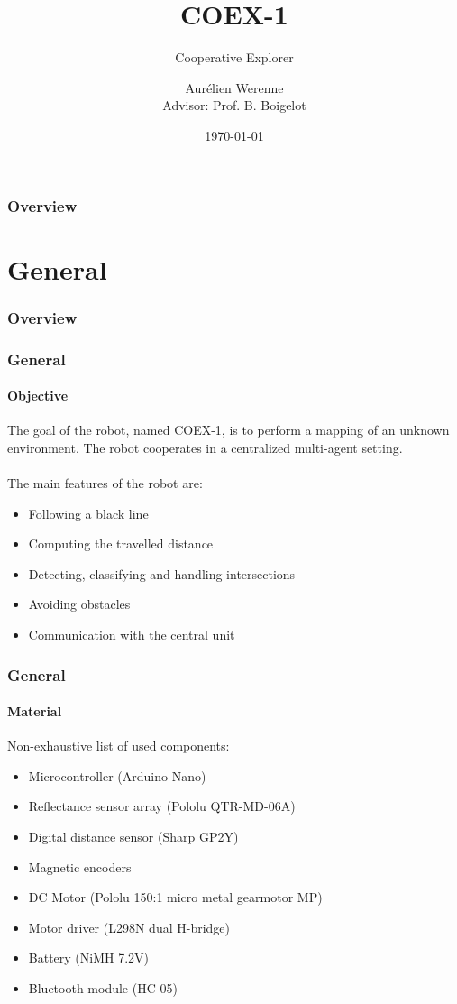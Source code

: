 \documentclass[10pt]{beamer}
\title[Cooperative Explorer]{COEX-1} %
\subtitle{Cooperative Explorer}
\author[Aurélien Werenne]{Aurélien Werenne \\ {\small Advisor: Prof. B. Boigelot}}
\institute[ULiège] 
{
University of Liège \\ 
\medskip
Link to code: \href{https://github.com/Werenne/multi-agent-mapping}{\textcolor{blue}{Github}}

}
\date{\today}
\begin{document}
\begin{frame}
\titlepage 
\end{frame}

\begin{frame}
\frametitle{Overview} 
\tableofcontents 
\end{frame}


\section{General} 

\begin{frame}
\frametitle{Overview}
\tableofcontents[currentsection,subsectionstyle=shaded]
\end{frame}

\begin{frame}
\frametitle{General}
\framesubtitle{Objective}
The goal of the robot, named COEX-1, is to perform a mapping of an unknown environment. The robot cooperates in a centralized multi-agent setting. \\~\\
The main features of the robot are:
\begin{itemize}
\item Following a black line
\item Computing the travelled distance
\item Detecting, classifying and handling intersections
\item Avoiding obstacles
\item Communication with the central unit 
\end{itemize}
\end{frame}

\begin{frame}
\frametitle{General}
\framesubtitle{Material}
Non-exhaustive list of used components:
\begin{itemize}
\item Microcontroller (Arduino Nano) 
\item Reflectance sensor array (Pololu QTR-MD-06A)
\item Digital distance sensor (Sharp GP2Y)
\item Magnetic encoders 
\item DC Motor (Pololu 150:1 micro metal gearmotor MP)
\item Motor driver (L298N dual H-bridge) 
\item Battery (NiMH 7.2V) 
\item Bluetooth module (HC-05) 
\end{itemize}
\end{frame}
\end{document}
